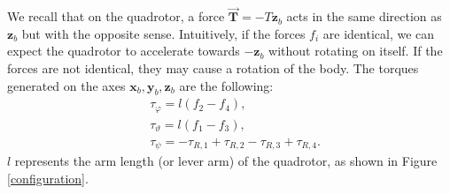 \documentclass[10pt, a4paper]{report}
\begin{document}
We recall that on the quadrotor, a force $\vec{\mathbf T}=-T\mathbf z_b$ acts in the same direction as $\mathbf z_b$ but with the opposite sense. Intuitively, if the forces $f_i$ are identical, we can expect the quadrotor to accelerate towards $-\mathbf z_b$ without rotating on itself. If the forces are not identical, they may cause a rotation of the body. The torques generated on the axes $\mathbf x_b,\mathbf y_b,\mathbf z_b$ are the following:\begin{align}
    &\tau_\varphi=l(f_2-f_4),\\ 
    &\tau_\vartheta=l(f_1-f_3),\\
    &\tau_\psi=-\tau_{R,1}+\tau_{R,2}-\tau_{R,3}+\tau_{R,4}.
\end{align}
$l$ represents the arm length (or lever arm) of the quadrotor, as shown in Figure \ref{configuration}.\bigskip
\end{document}
